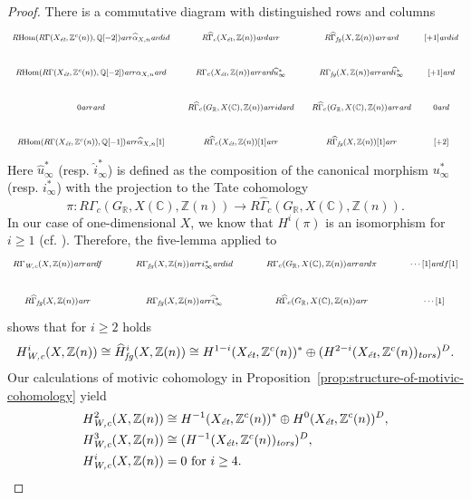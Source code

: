 \documentclass[draft]{article}
\DeclareMathOperator{\Hom}{Hom}
\newcommand{\CC}{\mathbb{C}}
\newcommand{\QQ}{\mathbb{Q}}
\newcommand{\RR}{\mathbb{R}}
\newcommand{\ZZ}{\mathbb{Z}}
\newcommand{\ar}{\text{\it ar}}
\newcommand{\et}{\text{\it \'{e}t}}
\newcommand{\fg}{\text{\it fg}}
\newcommand{\tors}{\text{\it tors}}
\newcommand{\Wc}{\text{\it W,c}}
\newcommand{\RHom}{R\!\Hom}
\theoremstyle{myplain}
\theoremstyle{mydefinition}
\begin{document}
\begin{proof}
  There is a commutative diagram with distinguished rows and columns
  \[ \begin{tikzcd}[font=\footnotesize,column sep=1em]
      \RHom (R\Gamma (X_\et, \ZZ^c(n)), \QQ[-2]) \ar{r}{\widehat{\alpha}_{X,n}} \ar{d}{id} &[0pt] R\widehat{\Gamma}_c (X_\et, \ZZ(n)) \ar{d} \ar{r} & R\widehat{\Gamma}_\fg (X, \ZZ(n)) \ar{r}\ar{d} &[-0.5em] {[+1]} \ar{d}{id} \\
      \RHom (R\Gamma (X_\et, \ZZ^c(n)), \QQ[-2]) \ar{r}{\alpha_{X,n}} \ar{d} & R\Gamma_c (X_\et, \ZZ(n)) \ar{r} \ar{d}{\widehat{u}^*_\infty} & R\Gamma_\fg (X, \ZZ(n)) \ar{r} \ar{d}{\widehat{i}^*_\infty} & {[+1]} \ar{d} \\
      0 \ar{r}\ar{d} & R\widehat{\Gamma}_c (G_\RR, X(\CC), \ZZ(n)) \ar{r}{id} \ar{d} & R\widehat{\Gamma}_c (G_\RR, X(\CC), \ZZ(n)) \ar{r} \ar{d} & 0 \ar{d} \\
      \RHom (R\Gamma (X_\et, \ZZ^c(n)), \QQ[-1]) \ar{r}{\widehat{\alpha}_{X,n} [1]} & R\widehat{\Gamma}_c (X_\et, \ZZ(n)) [1] \ar{r} & R\widehat{\Gamma}_\fg (X, \ZZ(n)) [1] \ar{r} & {[+2]}
    \end{tikzcd} \]
  Here $\widehat{u}^*_\infty$ (resp. $\widehat{i}^*_\infty$)
  is defined as the composition of the canonical morphism $u^*_\infty$
  (resp. $i^*_\infty$) with the projection to the Tate cohomology
  \[
    \pi\colon R\Gamma_c (G_\RR, X(\CC), \ZZ(n)) \to
    R\widehat{\Gamma}_c (G_\RR, X(\CC), \ZZ(n)).
  \]
  In our case of one-dimensional $X$, we know that $H^i (\pi)$ is an isomorphism
  for $i \ge 1$ (cf. \cite[Proposition~3.2]{Beshenov-Weil-etale-1}). Therefore,
  the five-lemma applied to
  \[ \begin{tikzcd}[font=\footnotesize]
      R\Gamma_\Wc (X, \ZZ(n)) \ar{r}\ar{d}{f} & R\Gamma_\fg (X, \ZZ(n)) \ar{r}{i^*_\infty}\ar{d}{id} & R\Gamma_c (G_\RR, X(\CC), \ZZ(n)) \ar{r}\ar{d}{\pi} & \cdots [1]\ar{d}{f [1]} \\
      R\widehat{\Gamma}_\fg (X, \ZZ(n)) \ar{r} & R\Gamma_\fg (X, \ZZ(n)) \ar{r}{\widehat{i}^*_\infty} & R\widehat{\Gamma}_c (G_\RR, X(\CC), \ZZ(n)) \ar{r} & \cdots [1]
    \end{tikzcd} \]
  shows that for $i \ge 2$ holds
  \[ H^i_\Wc (X, \ZZ(n)) \cong \widehat{H}^i_\fg (X, \ZZ(n))
    \cong H^{1-i} (X_\et, \ZZ^c(n))^*
    \oplus
    (H^{2-i} (X_\et, \ZZ^c (n))_\tors)^D. \]
  Our calculations of motivic cohomology in
  Proposition~\ref{prop:structure-of-motivic-cohomology} yield
  \begin{align*}
    H^2_\Wc (X, \ZZ(n)) & \cong H^{-1} (X_\et, \ZZ^c(n))^*
                          \oplus
                          H^0 (X_\et, \ZZ^c (n))^D, \\
    H^3_\Wc (X, \ZZ(n)) & \cong (H^{-1} (X_\et, \ZZ^c (n))_\tors)^D, \\
    H^i_\Wc (X, \ZZ(n)) & = 0 \text{ for }i \ge 4. \qedhere
  \end{align*}
\end{proof}
\end{document}
